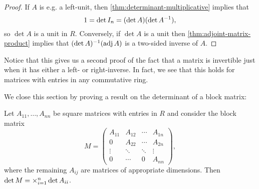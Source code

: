 \begin{proof}
    If $A$ is e.g. a left-unit, then \cref{thm:determinant-multiplicative} implies that
    \begin{equation*}
        1
            = \det I_n
            = (\det A)(\det A^{-1}),
    \end{equation*}
    so $\det A$ is a unit in $R$. Conversely, if $\det A$ is a unit then \cref{thm:adjoint-matrix-product} implies that $(\det A)^{-1}(\operatorname{adj} A)$ is a two-sided inverse of $A$.
\end{proof}

Notice that this gives us a second proof of the fact that a matrix is invertible just when it has either a left- or right-inverse. In fact, we see that this holds for matrices with entries in any commutative ring.


We close this section by proving a result on the determinant of a block matrix:

\begin{proposition}
    \label{prop:block-matrix-determinant}
    Let $A_{11}, \ldots, A_{nn}$ be square matrices with entries in $R$ and consider the block matrix
    \begin{equation*}
        M
            = \begin{pmatrix}
                A_{11} & A_{12} & \cdots & A_{1n} \\
                0      & A_{22} & \cdots & A_{2n} \\
                \vdots & \ddots & \ddots & \vdots \\
                0      & \cdots & 0      & A_{nn}
            \end{pmatrix},
    \end{equation*}
    where the remaining $A_{ij}$ are matrices of appropriate dimensions. Then $\det M = \bigprod_{i=1}^n \det A_{ii}$.
\end{proposition}

